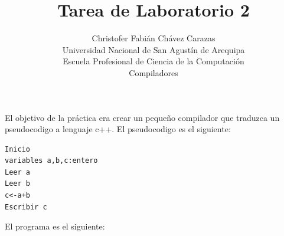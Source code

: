 \documentclass[a4paper,12pt]{article}
\begin{document}
\title{Tarea de Laboratorio 2}
\author{
Christofer Fabián Chávez Carazas \\
\small{Universidad Nacional de San Agustín de Arequipa} \\
\small{Escuela Profesional de Ciencia de la Computación} \\
\small{Compiladores}
}
\date{}

\maketitle

El objetivo de la práctica era crear un pequeño compilador que traduzca un pseudocodigo a lenguaje c++.
El pseudocodigo es el siguiente:

\begin{lstlisting}
Inicio
variables a,b,c:entero
Leer a
Leer b
c<-a+b
Escribir c
\end{lstlisting}

El programa es el siguiente:
\end{document}
